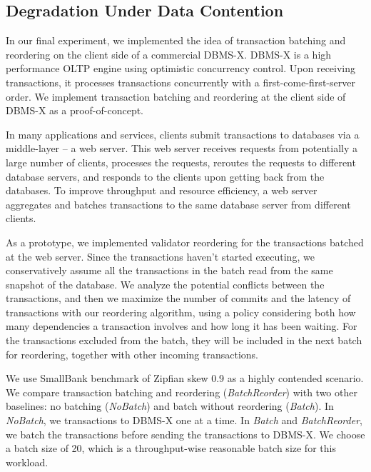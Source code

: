 \subsection{Degradation Under Data Contention}
\label{subsec:experiment:compare}

In our final experiment, we implemented the idea of transaction batching and reordering on the client side of a commercial DBMS-X. DBMS-X is a high performance OLTP engine using optimistic concurrency control. Upon receiving transactions, it processes transactions concurrently with a first-come-first-server order. We implement transaction batching and reordering at the client side of DBMS-X as a proof-of-concept.

In many applications and services, clients submit transactions to databases via a middle-layer -- a web server. This web server receives requests from potentially a large number of clients, processes the requests, reroutes the requests to different database servers, and responds to the clients upon getting back from the databases. To improve throughput and resource efficiency, a web server aggregates and batches transactions to the same database server from different clients. 

As a prototype, we implemented validator reordering for the transactions batched at the web server. Since the transactions haven't started executing, we conservatively assume all the transactions in the batch read from the same snapshot of the database. We analyze the potential conflicts between the transactions, and then we maximize the number of commits and the latency of transactions with our reordering algorithm, using a policy considering both how many dependencies a transaction involves and how long it has been waiting. For the transactions excluded from the batch, they will be included in the next batch for reordering, together with other incoming transactions.

We use SmallBank benchmark of Zipfian skew 0.9 as a highly contended scenario. We compare transaction batching and reordering (\emph{BatchReorder}) with two other baselines: no batching (\emph{NoBatch}) and batch without reordering (\emph{Batch}). In \emph{NoBatch}, we transactions to DBMS-X one at a time. In \emph{Batch} and \emph{BatchReorder}, we batch the transactions before sending the transactions to DBMS-X. We choose a batch size of 20, which is a throughput-wise reasonable batch size for this workload.


